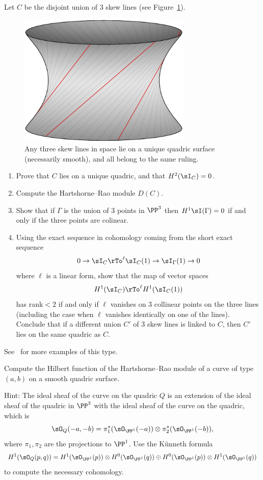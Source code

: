 \begin{exercise}
Let $C$ be the disjoint union of 3 skew lines (see Figure~\ref{Fig15.2}).

\begin{figure}
\inprogress
\centerline {\includegraphics[height=2.5in]{main/Fig15-2-SinglyRuledHyperboloid-good}}
\caption{Any three skew lines in space lie on a unique quadric surface (necessarily
smooth), and all belong to the same ruling.
}
\label{Fig15.2}
\end{figure}

\begin{enumerate}
 \item Prove that $C$ lies on a unique quadric, and that $H^2(\sI_C) = 0$.
 \item Compute the Hartshorne--Rao module $D(C)$.
 \item Show that if $\Gamma$ is the union of 3 points in $\PP^3$ then
 $H^1\sI(\Gamma) = 0$ if and only if the three points are colinear.
 \item Using the exact sequence in cohomology coming from the short exact sequence
$$
0\to \sI_C \rTo^{\ell} \sI_C(1) \to \sI_\Gamma(1) \to 0
$$
where $\ell$ is a linear form, show that the map of vector spaces
$$
H^1(\sI_C) \rTo^{\ell} H^1(\sI_C(1))
$$
has rank$<2$ if and only if $\ell$ vanishes on 3 collinear points on the three lines (including the case when $\ell$ vanishes identically on one of the lines).
Conclude that if a different union $C'$ of 3 skew lines is linked to $C$, then $C'$ lies on the same quadric as $C$.
\end{enumerate}
See~\cite{Migliore} for more examples of this type.
\end{exercise}

\begin{exercise}
 Compute the Hilbert function of the Hartshorne--Rao module of a curve of type $(a,b)$ on a smooth quadric surface.
 
 Hint: The ideal sheaf of the curve on the quadric $Q$ is an extension of the ideal sheaf of the quadric in $\PP^3$
 with the ideal sheaf of the curve on the quadric, which is 
 $$
 \sO_Q(-a,-b) = \pi_1^*(\sO_{\PP^1}(-a)) \otimes \pi_2^*(\sO_{\PP^1}(-b)),
 $$
 where $\pi_1, \pi_2$ are the projections to $\PP^1$. Use the K\"unneth formula
 $$
 H^1(\sO_Q(p,q)) = H^1(\sO_{\PP^1}(p)) \otimes H^0(\sO_{\PP^1}(q)) \oplus
  H^0(\sO_{\PP^1}(p)) \otimes H^1(\sO_{\PP^1}(q))
 $$
  to compute the necessary cohomology.
\end{exercise}

